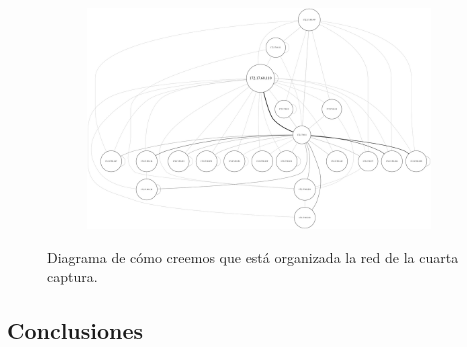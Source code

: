\begin{figure}[h]
  \begin{subfigure}{.5\textwidth}
    \includegraphics[width=\textwidth]{imagenes/mc/mcRed.png}
  \end{subfigure}
  \label{fig:exp1_labo_red}
  \caption{Diagrama de cómo creemos que está organizada la red de la cuarta captura.}
\end{figure}


\subsection{Conclusiones}


